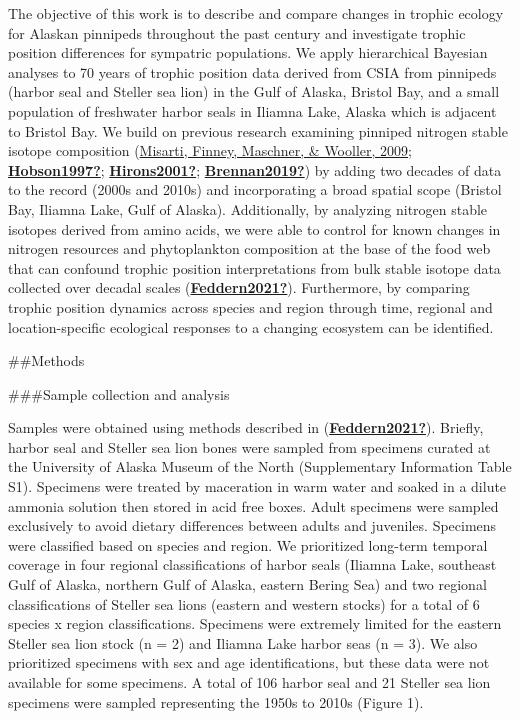 \documentclass [11pt, proquest] {uwthesis}[2015/03/03]
\begin{document}
The objective of this work is to describe and compare changes in trophic ecology for Alaskan pinnipeds throughout the past century and investigate trophic position differences for sympatric populations. We apply hierarchical Bayesian analyses to 70 years of trophic position data derived from CSIA from pinnipeds (harbor seal and Steller sea lion) in the Gulf of Alaska, Bristol Bay, and a small population of freshwater harbor seals in Iliamna Lake, Alaska which is adjacent to Bristol Bay. We build on previous research examining pinniped nitrogen stable isotope composition (\protect\hyperlink{ref-Misarti2009}{Misarti, Finney, Maschner, \& Wooller, 2009}; \protect\hyperlink{ref-Hobson1997}{\textbf{Hobson1997?}}; \protect\hyperlink{ref-Hirons2001}{\textbf{Hirons2001?}}; \protect\hyperlink{ref-Brennan2019}{\textbf{Brennan2019?}}) by adding two decades of data to the record (2000s and 2010s) and incorporating a broad spatial scope (Bristol Bay, Iliamna Lake, Gulf of Alaska). Additionally, by analyzing nitrogen stable isotopes derived from amino acids, we were able to control for known changes in nitrogen resources and phytoplankton composition at the base of the food web that can confound trophic position interpretations from bulk stable isotope data collected over decadal scales (\protect\hyperlink{ref-Feddern2021}{\textbf{Feddern2021?}}). Furthermore, by comparing trophic position dynamics across species and region through time, regional and location-specific ecological responses to a changing ecosystem can be identified.

\#\#Methods

\#\#\#Sample collection and analysis

Samples were obtained using methods described in (\protect\hyperlink{ref-Feddern2021}{\textbf{Feddern2021?}}). Briefly, harbor seal and Steller sea lion bones were sampled from specimens curated at the University of Alaska Museum of the North (Supplementary Information Table S1). Specimens were treated by maceration in warm water and soaked in a dilute ammonia solution then stored in acid free boxes. Adult specimens were sampled exclusively to avoid dietary differences between adults and juveniles. Specimens were classified based on species and region. We prioritized long-term temporal coverage in four regional classifications of harbor seals (Iliamna Lake, southeast Gulf of Alaska, northern Gulf of Alaska, eastern Bering Sea) and two regional classifications of Steller sea lions (eastern and western stocks) for a total of 6 species x region classifications. Specimens were extremely limited for the eastern Steller sea lion stock (n = 2) and Iliamna Lake harbor seas (n = 3). We also prioritized specimens with sex and age identifications, but these data were not available for some specimens. A total of 106 harbor seal and 21 Steller sea lion specimens were sampled representing the 1950s to 2010s (Figure 1).
\end{document}
